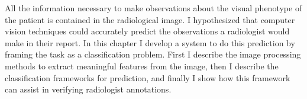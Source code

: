 All the information necessary to make observations about the visual phenotype of the patient is contained in the radiological image. I hypothesized that computer vision techniques could accurately predict the observations a radiologist would make in their report. In this chapter I develop a system to do this prediction by framing the task as a classification problem. First I describe the image processing methods to extract meaningful features from the image, then I describe the classification frameworks for prediction, and finally I show how this framework can assist in verifying radiologist annotations.